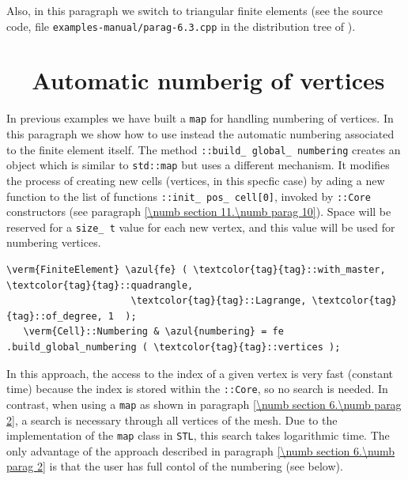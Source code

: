 Also, in this paragraph we switch to triangular finite elements (see the source code,
file {\small\tt examples-manual/parag-6.3.cpp} in the distribution tree of \maniFEM).


\section{~~Automatic numberig of vertices}\label{\numb section 6.\numb parag 4}

In previous examples we have built a {\small\tt map} for handling numbering of vertices.
In this paragraph we show how to use instead the automatic numbering associated to the
finite element itself.
The method {\small\tt{}::build\_\,global\_\,numbering} creates
an object which is similar to {\small\tt std::map} but uses a different mechanism.
It modifies the process of creating new cells (vertices, in this specfic case)
by ading a new function to the list of functions
{\small\tt{}::init\_\,pos\_\,cell[0]},
invoked by {\small\tt{}::Core} constructors
(see paragraph \ref{\numb section 11.\numb parag 10}).
Space will be reserved for a {\small\tt size\_\,t} value for each new vertex, and
this value will be used for numbering vertices.

\begin{Verbatim}[commandchars=\\\{\},formatcom=\small\tt,frame=single,
   label=parag-\ref{\numb section 6.\numb parag 4}.cpp,rulecolor=\color{moldura},
   baselinestretch=0.94,framesep=2mm                                            ]
   \verm{FiniteElement} \azul{fe} ( \textcolor{tag}{tag}::with_master, \textcolor{tag}{tag}::quadrangle,
                      \textcolor{tag}{tag}::Lagrange, \textcolor{tag}{tag}::of_degree, 1  );
   \verm{Cell}::Numbering & \azul{numbering} = fe .build_global_numbering ( \textcolor{tag}{tag}::vertices );
\end{Verbatim}

In this approach, the access to the index of a given vertex is very fast (constant time)
because the index is stored within the {\small\tt{}::Core}, so no search is needed.
In contrast, when using a {\small\tt map} as shown in paragraph
\ref{\numb section 6.\numb parag 2}, a search is necessary through all vertices of the mesh.
Due to the implementation of the {\small\tt map} class in {\tt STL}, this search takes
logarithmic time.
The only advantage of the approach described in paragraph \ref{\numb section 6.\numb parag 2}
is that the user has full contol of the numbering (see below).

